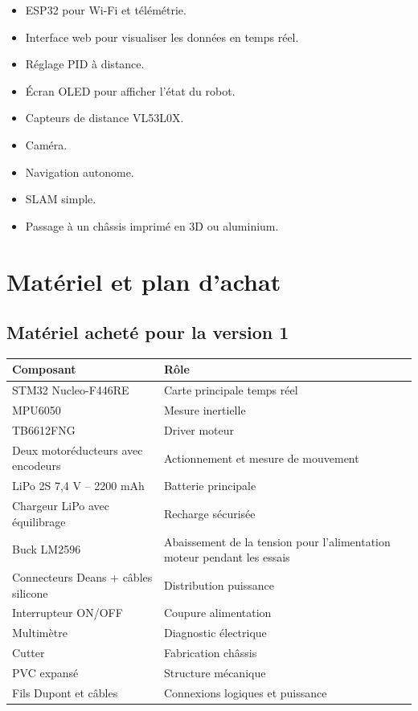 \documentclass[11pt,a4paper]{article}
\begin{document}
	\begin{itemize}
		\item ESP32 pour Wi-Fi et télémétrie.
		\item Interface web pour visualiser les données en temps réel.
		\item Réglage PID à distance.
		\item Écran OLED pour afficher l'état du robot.
		\item Capteurs de distance VL53L0X.
		\item Caméra.
		\item Navigation autonome.
		\item SLAM simple.
		\item Passage à un châssis imprimé en 3D ou aluminium.
	\end{itemize}
	
	\section{Matériel et plan d'achat}
	
	\subsection*{Matériel acheté pour la version 1}
	
	\begin{longtable}{p{6cm}p{7.5cm}}
		\toprule
		\textbf{Composant} & \textbf{Rôle} \\
		\midrule
		STM32 Nucleo-F446RE & Carte principale temps réel \\
		MPU6050 & Mesure inertielle \\
		TB6612FNG & Driver moteur \\
		Deux motoréducteurs avec encodeurs & Actionnement et mesure de mouvement \\
		LiPo 2S 7,4 V -- 2200 mAh & Batterie principale \\
		Chargeur LiPo avec équilibrage & Recharge sécurisée \\
		Buck LM2596 & Abaissement de la tension pour l'alimentation moteur pendant les essais \\
		Connecteurs Deans + câbles silicone & Distribution puissance \\
		Interrupteur ON/OFF & Coupure alimentation \\
		Multimètre & Diagnostic électrique \\
		Cutter & Fabrication châssis \\
		PVC expansé & Structure mécanique \\
		Fils Dupont et câbles & Connexions logiques et puissance \\
		\bottomrule
	\end{longtable}
	
\end{document}
